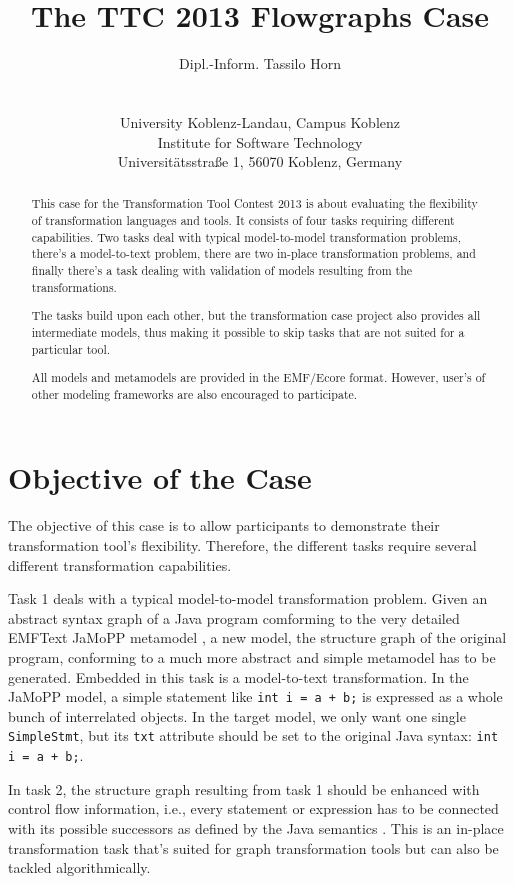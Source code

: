 \documentclass[11pt]{article}
\title{The TTC 2013 Flowgraphs Case}
\author{Dipl.-Inform. Tassilo Horn\\
  \myemail\\
  \vspace{0.3cm}\\
  University Koblenz-Landau, Campus Koblenz\\
  Institute for Software Technology\\
  Universitätsstraße 1, 56070 Koblenz, Germany}
\begin{document}
\maketitle

\begin{abstract}
  This case for the Transformation Tool Contest 2013 is about evaluating the
  flexibility of transformation languages and tools.  It consists of four tasks
  requiring different capabilities.  Two tasks deal with typical model-to-model
  transformation problems, there's a model-to-text problem, there are two
  in-place transformation problems, and finally there's a task dealing with
  validation of models resulting from the transformations.

  The tasks build upon each other, but the transformation case project also
  provides all intermediate models, thus making it possible to skip tasks that
  are not suited for a particular tool.

  All models and metamodels are provided in the EMF/Ecore format.  However,
  user's of other modeling frameworks are also encouraged to participate.
\end{abstract}

\sloppy

\section{Objective of the Case}
\label{sec:objective}

The objective of this case is to allow participants to demonstrate their
transformation tool's flexibility.  Therefore, the different tasks require
several different transformation capabilities.

Task 1 deals with a typical model-to-model transformation problem.  Given an
abstract syntax graph of a Java program comforming to the very detailed EMFText
JaMoPP metamodel \cite{jamopp09}, a new model, the structure graph of the
original program, conforming to a much more abstract and simple metamodel has
to be generated.  Embedded in this task is a model-to-text transformation.  In
the JaMoPP model, a simple statement like \verb|int i = a + b;| is expressed as
a whole bunch of interrelated objects.  In the target model, we only want one
single \verb|SimpleStmt|, but its \verb|txt| attribute should be set to the
original Java syntax: \verb|int i = a + b;|.

In task 2, the structure graph resulting from task 1 should be enhanced with
control flow information, i.e., every statement or expression has to be
connected with its possible successors as defined by the Java semantics
\cite{Java7Spec}.  This is an in-place transformation task that's suited for
graph transformation tools but can also be tackled algorithmically.
\end{document}
